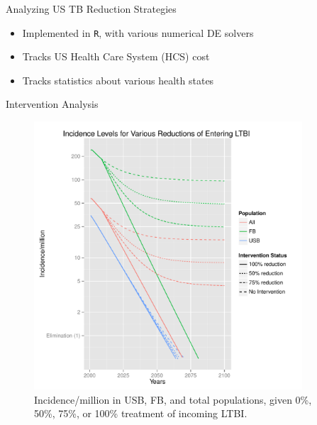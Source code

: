 \documentclass[final]{beamer}
\begin{document}
\begin{frame}
\begin{columns}
    \begin{column}{.3\textwidth}
      \vspace{-1.5em}
      \begin{block}{Analyzing US TB Reduction Strategies}
        \begin{itemize}
          \item Implemented in \texttt{R}, with various numerical DE solvers
          \item Tracks US Health Care System (HCS) cost
          \item Tracks statistics about various health states
        \end{itemize}
        \begin{block}{Intervention Analysis}
          \vspace{-1.6em}
            \begin{figure}[h]
              \begin{center}
                \includegraphics[height=10cm,width=\textwidth]{incidencePlotRedEnLTBI}
              \end{center}
              \caption{Incidence/million in USB, FB, and total populations,
                       given 0\%, 50\%, 75\%, or 100\% treatment of incoming
                       LTBI.}
              \label{fig:redEnLTBI_incidence}
            \end{figure}
            \begin{figure}[h]

\end{figure}
\end{block}
\end{block}
\end{column}
\end{columns}
\end{frame}
\end{document}
